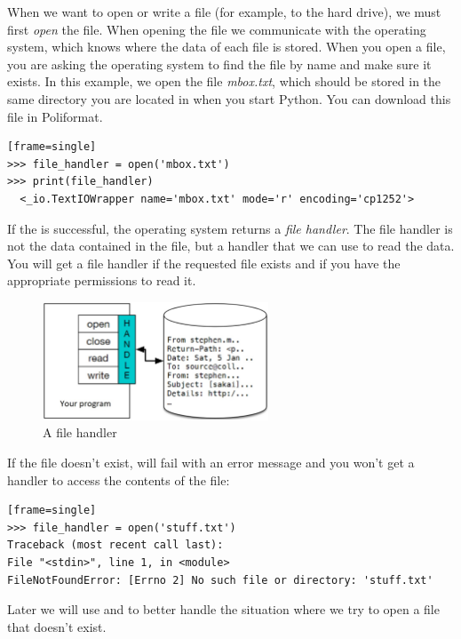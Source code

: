   

When we want to open or write a file (for example, to the hard drive), we must first \emph{open} the file. When opening the file we communicate with the operating system, which knows where the data of each file is stored. When you open a file, you are asking the operating system to find the file by name and make sure it exists. In this example, we open the file \emph{mbox.txt}, which should be stored in the same directory you are located in when you start Python. You can download this file in Poliformat.

\begin{Verbatim}[frame=single][frame=single]
>>> file_handler = open('mbox.txt')
>>> print(file_handler)
  <_io.TextIOWrapper name='mbox.txt' mode='r' encoding='cp1252'>
\end{Verbatim}


If the  is successful, the operating system returns a \emph{file handler}. The file handler is not the data contained in the file, but a handler that we can use to read the data. You will get a file handler if the requested file exists and if you have the appropriate permissions to read it.

\begin{figure}
\centering
\includegraphics[width=0.6\textwidth]{images/ha.jpg}
\caption{A file handler}
\end{figure}

If the file doesn't exist,  will fail with an error message and you won't get a handler to access the contents of the file:

\begin{Verbatim}[frame=single][frame=single]
>>> file_handler = open('stuff.txt')
Traceback (most recent call last):
File "<stdin>", line 1, in <module>
FileNotFoundError: [Errno 2] No such file or directory: 'stuff.txt'
\end{Verbatim}

Later we will use  and  to better handle the situation where we try to open a file that doesn't exist.

